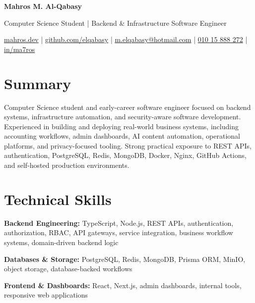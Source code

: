 \documentclass[10pt,a4paper]{article}
\newcommand{\name}[1]{
  {\Huge \bfseries \color{heading} #1}
}
\newcommand{\role}[1]{
  \vspace{3pt}
  {\large \color{text} #1}
}
\newcommand{\contact}[1]{
  \vspace{6pt}
  {\small \color{muted} #1}
}
\newcommand{\skillgroup}[2]{
  \textbf{\color{heading} #1:} #2\par
}
\begin{document}
\color{text}
\begin{center}
  \name{Mahros M. Al-Qabasy}
    
  \role{Computer Science Student \; | \; Backend \& Infrastructure Software Engineer}

  \contact{
    \href{https://mahros.dev}{mahros.dev}
    \; | \;
    \href{https://github.com/elqabasy}{github.com/elqabasy}
    \; | \;
    \href{mailto:m.elqabasy@hotmail.com}{m.elqabasy@hotmail.com}
    \; | \;
    \href{https://wa.me/201015888272}{010 15 888 272}
    \; | \;
    \href{https://linkedin.com/in/ma7ros}{in/ma7ros}
  }
\end{center}

\vspace{4pt}

\section*{Summary}

Computer Science student and early-career software engineer focused on backend systems, infrastructure automation, and security-aware software development. Experienced in building and deploying real-world business systems, including accounting workflows, admin dashboards, AI content automation, operational platforms, and privacy-focused tooling. Strong practical exposure to REST APIs, authentication, PostgreSQL, Redis, MongoDB, Docker, Nginx, GitHub Actions, and self-hosted production environments.



\vspace{4pt}



\section*{Technical Skills}

\skillgroup{Backend Engineering}
{TypeScript, Node.js, REST APIs, authentication, authorization, RBAC, API gateways, service integration, business workflow systems, domain-driven backend logic}

\skillgroup{Databases \& Storage}
{PostgreSQL, Redis, MongoDB, Prisma ORM, MinIO, object storage, database-backed workflows}

\skillgroup{Frontend \& Dashboards}
{React, Next.js, admin dashboards, internal tools, responsive web applications}
\end{document}

